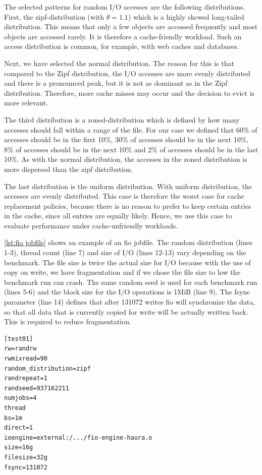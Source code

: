 \documentclass[
	12pt,
	a4paper,
	abstract,
	bibliography=totoc,
	chapterprefix,
	headings=openright,
	numbers=endperiod,
	parskip=half,
	twoside,
]{scrreprt}
\begin{document}
The selected patterns for random I/O accesses are the following distributions.
First, the zipf-distribution (with $\theta=1.1$) which is a highly skewed long-tailed distribution.
This means that only a few objects are accessed frequently and most objects are accessed rarely.
It is therefore a cache-friendly workload.
Such an access distribution is common, for example, with web caches and databases.

Next, we have selected the normal distribution.
The reason for this is that compared to the Zipf distribution, 
the I/O accesses are more evenly distributed and there is a pronounced peak, 
but it is not as dominant as in the Zipf distribution.
Therefore, more cache misses may occur and 
the decision to evict is more relevant.

The third distribution is a zoned-distribution which is defined by 
how many accesses should fall within a range of the file.
For our case we defined that 60\% of accesses should be in the first 10\%,
30\% of accesses should be in the next 10\%, 8\% of accesses should be in the next 10\% and
2\% of accesses should be in the last 10\%.
As with the normal distribution, the accesses in the 
zoned distribution is more dispersed than the zipf distribution.

The last distribution is the uniform distribution.
With uniform distribution, the accesses are evenly distributed.
This case is therefore the worst case for cache replacement policies, 
because there is no reason to prefer to keep certain entries in the cache, 
since all entries are equally likely.
Hence, we use this case to evaluate performance under cache-unfriendly workloads.

\cref{lst:fio jobfile} shows an example of an fio jobfile.
The random distribution (lines 1-3), thread count (line 7) and size of I/O 
(lines 12-13) vary depending on the benchmark.
The file size is twice the actual size for I/O because with the use of  copy on write, 
we have fragmentation and if we chose the file size to low the benchmark run can crash.
The same random seed is used for each benchmark run (lines 5-6) and the block size 
for the I/O operations is 1MiB (line 9).
The fsync parameter (line 14) defines that after 131072 writes fio will synchronize the  
data, so that all data that is currently copied for write will be actually written back.
This is required to reduce fragmentation.

\bigskip

\begin{lstlisting}[mathescape=true,caption=example fio jobfile, label=lst:fio jobfile]
[test01]
rw=randrw
rwmixread=90
random_distribution=zipf
randrepeat=1
randseed=937162211
numjobs=4
thread
bs=1m
direct=1
ioengine=external:/.../fio-engine-haura.o
size=16g
filesize=32g
fsync=131072
\end{lstlisting}
\end{document}
